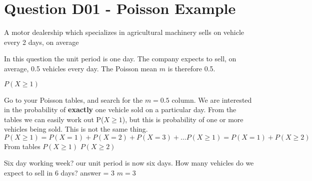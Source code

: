 \section{Question D01  - Poisson Example}
A motor dealership which specializes in agricultural machinery sells on vehicle every 2 days, on average

In this question the unit period is one day. The company expects to sell, on average, 0.5 vehicles every day.
The Poisson mean $m$ is therefore 0.5.

$P(X \geq 1)$

Go to your Poisson tables, and search for the $m=0.5$ column.
We are interested in the probability of \textbf{exactly} one vehicle sold on a particular day.
From the tables we can easily work out P($X \geq 1$), but this is probability of one or more vehicles being sold.
This is not the same thing.
\[P(X \geq 1) = P(X =1) + P( X=2) + P(X=3) + \ldots
P(X \geq 1) = P(X=1) + P(X \geq 2)\]
From tables
$P(X \geq 1)$
$P(X \geq 2)$

Six day working week?
our unit period is now six days.
How many vehicles do we expect to sell in 6 days?
answer = 3
$m=3$